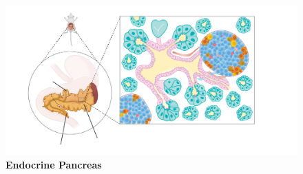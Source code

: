 \begin{figure}[ht]
\centering
\includegraphics[width=\linewidth]{Chapter1/Fig/F1-1-01.png}
\caption[sec1-1endopanc]{\textbf{Endocrine Pancreas}}
\label{fig1-1}
\end{figure}



